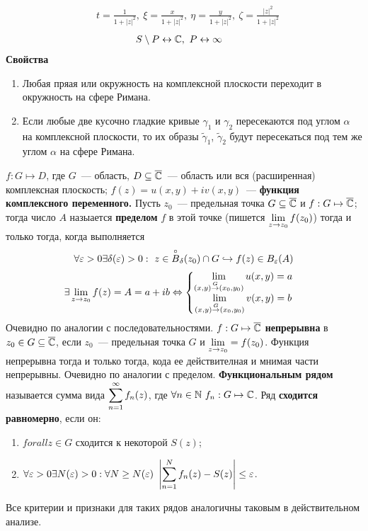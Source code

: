 \begin{align*}
  & t = \frac{1}{1+ \left| z \right|^2}, \ \xi = \frac{x}{1+ \left| z \right|^2}, \ \eta = \frac{y}{1+ \left| z \right|^2}, \ \zeta = \frac{\left| z \right|^2}{1+ \left| z \right|^2}
\end{align*}
\begin{align*}
  & S \setminus P \leftrightarrow \mathbb{C}, \ P \leftrightarrow \infty
\end{align*}
\textbf{Свойства}
\begin{enumerate}
    \item Любая пряая или окружность на комплексной плоскости переходит в
    окружность на сфере Римана.
    \item Если любые две кусочно гладкие кривые $\gamma_1$ и $\gamma_2$
    пересекаются под углом $\alpha$ на комплексной плоскости, то их образы
    $\tilde{\gamma}_1$, $\tilde{\gamma}_2$ будут пересекаться под тем же углом
    $\alpha$ на сфере Римана.
\end{enumerate}
\Def
$f: G \mapsto D$, где $G$~--- область, $D \subseteq \overline{\mathbb{C}}$~--- область или вся
(расширенная) комплексная плоскость; $f(z) = u(x,y) + iv(x,y)$~---
\textbf{функция комплексного переменного.}
\Def
Пусть $z_0$~--- предельная точка $G \subseteq \overline{\mathbb{C}}$ и $f: G \mapsto \overline{\mathbb{C}}$; тогда
число $A$ назыается \textbf{пределом} $f$ в этой точке (пишется $\displaystyle \lim_{z \to
  z_0} f(z_0)$) тогда и только тогда, когда выполняется
\begin{equation}\label{(2.3)}
    \forall \varepsilon > 0 \exists \delta(\varepsilon) > 0: \ z \in \overset{\circ}{B}_\delta(z_0)\cap G \hookrightarrow f(z) \in B_\varepsilon (A)
\end{equation}
\asm
\begin{align*}
  & \exists \lim_{z \to z_0}f(z) = A = a+ib \Leftrightarrow \left\{ \begin{matrix}
          \displaystyle \lim_{(x,y)\overset{G}{\to}(x_0,y_0)}u(x,y) = a \\
          \displaystyle \lim_{(x,y)\overset{G}{\to}(x_0,y_0)}v(x,y) = b
      \end{matrix} \right.
\end{align*}
\pr
Очевидно по аналогии с последовательностями.
\Def
$f: G \mapsto \overline{\mathbb{C}}$ \textbf{непрерывна} в $z_0 \in G \subseteq \overline{\mathbb{C}}$, если
$z_0$~--- предельная точка $G$ и $\displaystyle \lim_{z \to z_0} = f(z_0)$.
\asm
Функция непрерывна тогда и только тогда, кода ее действителная и мнимая части
непрерывны.
\pr Очевидно по аналогии с пределом.
\Def
\textbf{Функциональным рядом} называется сумма вида $\displaystyle \sum_{n=1}^\infty
f_n(z)$, где $\forall n \in \mathbb{N} \ f_n :G \mapsto \mathbb{C}$.
\Def
Ряд \textbf{сходится равномерно}, если он:
\begin{enumerate}
    \item $forall z \in G$ сходится к некоторой $S(z)$;
    \item $\forall \varepsilon > 0 \exists N(\varepsilon) > 0: \forall N \geq N
    (\varepsilon) \ \left| \displaystyle \sum_{n=1}^Nf_n(z) - S(z) \right|\leq
    \varepsilon$.
\end{enumerate}
Все критерии и признаки для таких рядов аналогичны таковым в действительном
анализе.    